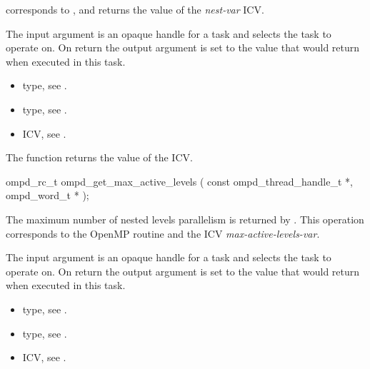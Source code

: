 \descr
{} corresponds to ,
and returns the value of the \emph{nest-var} ICV.

\argdesc
The input argument  is an opaque handle for a task and selects the task to operate on.
On return the output argument  is set to the value that  would return when
executed in this task.

\crossreferences
\begin{itemize}
	\item {} type, see .
	\item {} type, see .
	\item {} ICV, see .
\end{itemize}


\label{ompd:ompd_get_max_active_levels}
\summary
The  function returns the value of the  ICV.

\format
\cspecificstart
\begin{boxedcode}
ompd\_rc\_t ompd\_get\_max\_active\_levels (
  const ompd\_thread\_handle\_t  *, 
  ompd\_word\_t * 
);
\end{boxedcode}
\cspecificend

\descr
The maximum number of nested levels parallelism is returned by
.
This operation corresponds to the OpenMP routine
and the ICV \emph{max-active-levels-var}.%

\argdesc
The input argument  is an opaque handle for a task and selects the task to operate on.
On return the output argument  is set to the value that  would return when
executed in this task.

\crossreferences
\begin{itemize}
	\item {} type, see .
	\item {} type, see .
	\item {} ICV, see .
\end{itemize}


